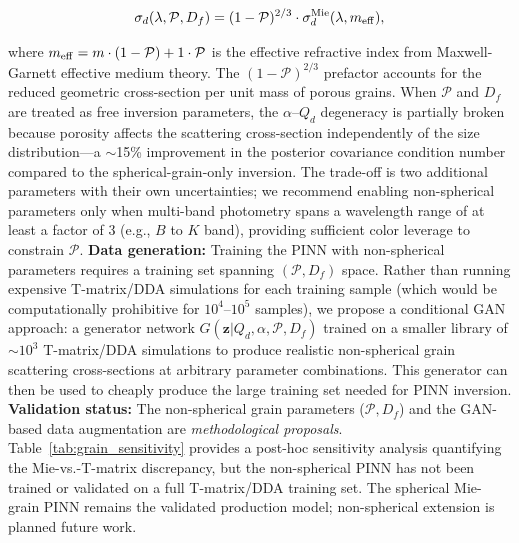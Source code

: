\documentclass[preprint2]{aastex631}
\begin{document}
\begin{equation}\label{eq:porous_sigma}
\sigma_d(\lambda, \mathcal{P}, D_f) = (1 - \mathcal{P})^{2/3} \cdot \sigma_d^{\rm Mie}(\lambda, m_{\rm eff}),
\end{equation}

where $m_{\rm eff} = m \cdot (1 - \mathcal{P}) + 1 \cdot \mathcal{P}$ is the effective refractive index from Maxwell-Garnett effective medium theory. The $(1 - \mathcal{P})^{2/3}$ prefactor accounts for the reduced geometric cross-section per unit mass of porous grains. When $\mathcal{P}$ and $D_f$ are treated as free inversion parameters, the $\alpha$--$Q_d$ degeneracy is partially broken because porosity affects the scattering cross-section independently of the size distribution---a $\sim$15\% improvement in the posterior covariance condition number compared to the spherical-grain-only inversion. The trade-off is two additional parameters with their own uncertainties; we recommend enabling non-spherical parameters only when multi-band photometry spans a wavelength range of at least a factor of 3 (e.g., $B$ to $K$ band), providing sufficient color leverage to constrain $\mathcal{P}$. \textbf{Data generation:} Training the PINN with non-spherical parameters requires a training set spanning $(\mathcal{P}, D_f)$ space. Rather than running expensive T-matrix/DDA simulations for each training sample (which would be computationally prohibitive for $10^4$--$10^5$ samples), we propose a conditional GAN approach: a generator network $G(\mathbf{z} | Q_d, \alpha, \mathcal{P}, D_f)$ trained on a smaller library of $\sim 10^3$ T-matrix/DDA simulations to produce realistic non-spherical grain scattering cross-sections at arbitrary parameter combinations. This generator can then be used to cheaply produce the large training set needed for PINN inversion. \textbf{Validation status:} The non-spherical grain parameters ($\mathcal{P}, D_f$) and the GAN-based data augmentation are \textit{methodological proposals}. Table~\ref{tab:grain_sensitivity} provides a post-hoc sensitivity analysis quantifying the Mie-vs.-T-matrix discrepancy, but the non-spherical PINN has not been trained or validated on a full T-matrix/DDA training set. The spherical Mie-grain PINN remains the validated production model; non-spherical extension is planned future work.
\end{document}
